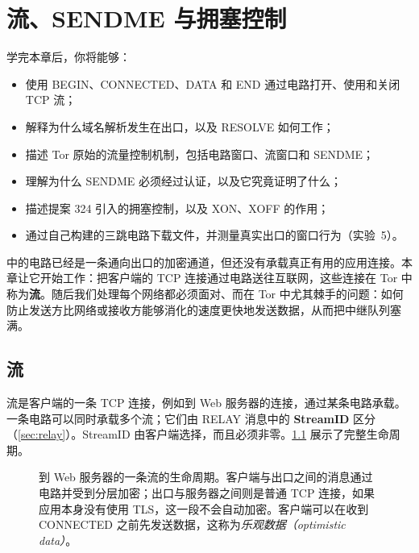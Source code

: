 \chapter{流、SENDME 与拥塞控制}\label{cap:11-stream}

\begin{obiettivi}
学完本章后，你将能够：
\begin{itemize}[nosep]
  \item 使用 BEGIN、CONNECTED、DATA 和 END 通过电路打开、使用和关闭 TCP 流；
  \item 解释为什么域名解析发生在出口，以及 RESOLVE 如何工作；
  \item 描述 Tor 原始的流量控制机制，包括电路窗口、流窗口和 SENDME；
  \item 理解为什么 SENDME 必须经过认证，以及它究竟证明了什么；
  \item 描述提案 324 引入的拥塞控制，以及 XON、XOFF 的作用；
  \item 通过自己构建的三跳电路下载文件，并测量真实出口的窗口行为（实验~5）。
\end{itemize}
\end{obiettivi}

 中的电路已经是一条通向出口的加密通道，但还没有承载真正有用的应用连接。本章让它开始工作：把客户端的 TCP 连接通过电路送往互联网，这些连接在 Tor 中称为\textbf{流}。随后我们处理每个网络都必须面对、而在 Tor 中尤其棘手的问题：如何防止发送方比网络或接收方能够消化的速度更快地发送数据，从而把中继队列塞满。

\section{流}\label{sec:stream}

流是客户端的一条 TCP 连接，例如到 Web 服务器的连接，通过某条电路承载。一条电路可以同时承载多个流；它们由 RELAY 消息中的 \textbf{StreamID} 区分（\cref{sec:relay}）。StreamID 由客户端选择，而且必须非零。\cref{fig:stream} 展示了完整生命周期。

\begin{figure}[htbp]
\centering

\caption{到 Web 服务器的一条流的生命周期。客户端与出口之间的消息通过电路并受到分层加密；出口与服务器之间则是普通 TCP 连接，如果应用本身没有使用 TLS，这一段不会自动加密。客户端可以在收到 CONNECTED 之前先发送数据，这称为\emph{乐观数据（optimistic data）}。}
\label{fig:stream}
\end{figure}

